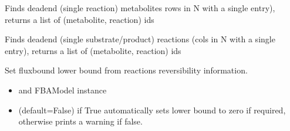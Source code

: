 \documentclass[letterpaper,10pt,english]{sphinxmanual}
\begin{document}
\begin{fulllineitems}
\label{\detokenize{modules_doc:cbmpy.CBTools.findDeadEndMetabolites}}
\pysigstartsignatures
{}
\pysigstopsignatures
\sphinxAtStartPar
Finds dead\sphinxhyphen{}end (single reaction) metabolites rows in N with a single entry), returns a list of (metabolite, reaction) ids

\end{fulllineitems}


\begin{fulllineitems}
\label{\detokenize{modules_doc:cbmpy.CBTools.findDeadEndReactions}}
\pysigstartsignatures
{}
\pysigstopsignatures
\sphinxAtStartPar
Finds dead\sphinxhyphen{}end (single substrate/product) reactions (cols in N with a single entry), returns a list of (metabolite, reaction) ids

\end{fulllineitems}


\begin{fulllineitems}
\label{\detokenize{modules_doc:cbmpy.CBTools.fixReversibility}}
\pysigstartsignatures
{}
\pysigstopsignatures
\sphinxAtStartPar
Set fluxbound lower bound from reactions reversibility information.
\begin{itemize}
\item {} 
\sphinxAtStartPar
{} and FBAModel instance

\item {} 
\sphinxAtStartPar
{} (default=False) if True automatically sets lower bound to zero if required, otherwise prints a warning if false.

\end{itemize}

\end{fulllineitems}
\end{document}
